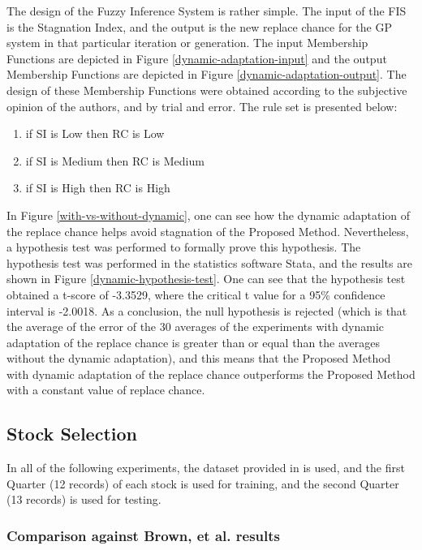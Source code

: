 The design of the Fuzzy Inference System is rather simple. The input of the FIS is the Stagnation Index, and the output is the new replace chance for the GP system in that particular iteration or generation. The input Membership Functions are depicted in Figure \ref{dynamic-adaptation-input} and the output Membership Functions are depicted in Figure \ref{dynamic-adaptation-output}. The design of these Membership Functions were obtained according to the subjective opinion of the authors, and by trial and error. The rule set is presented below:

\begin{enumerate}
\item if SI is Low then RC is Low
\item if SI is Medium then RC is Medium
\item if SI is High then RC is High
\end{enumerate}

In Figure \ref{with-vs-without-dynamic}, one can see how the dynamic adaptation of the replace chance helps avoid stagnation of the Proposed Method. Nevertheless, a hypothesis test was performed to formally prove this hypothesis. The hypothesis test was performed in the statistics software Stata, and the results are shown in Figure \ref{dynamic-hypothesis-test}. One can see that the hypothesis test obtained a t-score of -3.3529, where the critical t value for a 95\% confidence interval is -2.0018. As a conclusion, the null hypothesis is rejected (which is that the average of the error of the 30 averages of the experiments with dynamic adaptation of the replace chance is greater than or equal than the averages without the dynamic adaptation), and this means that the Proposed Method with dynamic adaptation of the replace chance outperforms the Proposed Method with a constant value of replace chance.

\subsection{Stock Selection}

In all of the following experiments, the dataset provided in \cite{brown2013dynamic} is used, and the first Quarter (12 records) of each stock is used for training, and the second Quarter (13 records) is used for testing.

\subsubsection{Comparison against Brown, et al. results}


